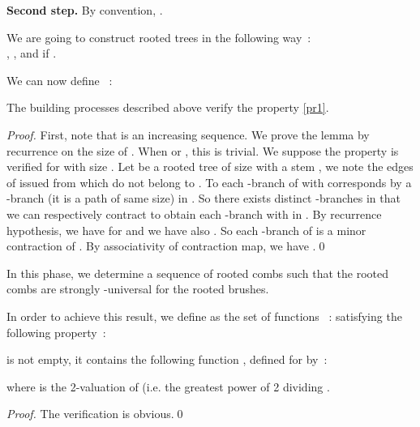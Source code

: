 \documentclass{llncs}
\begin{document}
\textbf{Second step.} By convention, .

We are going to construct rooted trees  in the following
way~:\\ , , and   if .

We can now define ~:







\begin{lemma} The building processes described above verify the
property \ref{pr1}.
\end{lemma}




\begin{proof} First, note that 
is an increasing sequence. We prove the lemma by recurrence on the
size  of . When  or , this is trivial. We
suppose the property is verified for  with size . Let
 be a rooted tree of size  with a stem , we note
 the edges of  issued from  which do
not belong to . To each -branch of  with  corresponds by  a
-branch (it is a path of same size) in . So there exists  distinct -branches  in  that we can respectively contract to obtain each
-branch with  in . By recurrence hypothesis, we have for  and we have also . So
each -branch of  is a minor contraction of . By associativity of contraction map,
we have .\qed
\end{proof}




In this phase, we determine a sequence of rooted combs  such that the rooted combs
 are strongly -universal for the rooted brushes.

In order to achieve this result, we define  as the set of
functions ~: 
satisfying the following property~:








\begin{lemma}  is not empty, it contains the following function
, defined for  by~:






\noindent
where  is the 2-valuation of  (i.e. the
greatest power of 2 dividing .
\end{lemma}


\begin{proof}The verification is obvious.\qed
\end{proof}
\end{document}
